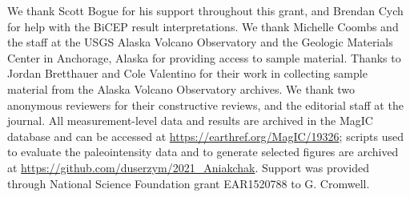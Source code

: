 \documentclass[draft]{agujournal2019}
\begin{document}
\acknowledgments
We thank Scott Bogue for his support throughout this grant, and Brendan Cych for help with the BiCEP result interpretations. We thank Michelle Coombs and the staff at the USGS Alaska Volcano Observatory and the Geologic Materials Center in Anchorage, Alaska  for providing access to sample material. Thanks to Jordan Bretthauer and Cole Valentino for their work in collecting sample material from the Alaska Volcano Observatory archives. We thank two anonymous reviewers for their constructive reviews, and the editorial staff at the journal. All measurement-level data and results are archived in the MagIC database and can be accessed at \url{https://earthref.org/MagIC/19326}; scripts used to evaluate the paleointensity data and to generate selected figures are archived at \url{https://github.com/duserzym/2021_Aniakchak}. Support was provided through National Science Foundation grant EAR1520788 to G. Cromwell. 



\end{document}

